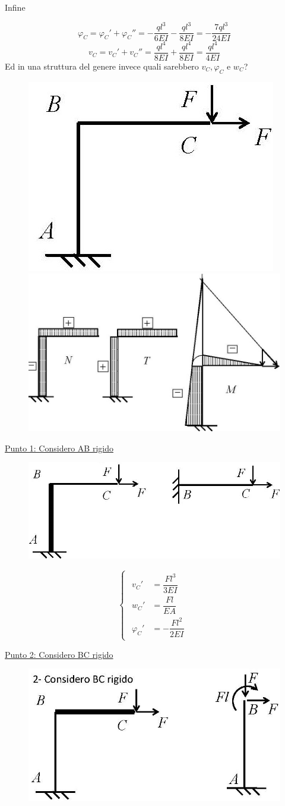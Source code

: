 \documentclass{article}
\begin{document}
\begin{adjustwidth}{2in}{}
		Infine 
		
		\[ \varphi_C = \varphi_C' + \varphi_C'' = -\dfrac{ql^3}{6EI} - \dfrac{ql^3}{8EI} = -\dfrac{7ql^3}{24EI}  \]
		\[ v_C = v_C' + v_C'' = \dfrac{ql^4}{8EI} + \dfrac{ql^4}{8EI} = \dfrac{ql^4}{4EI} \]
\newpage		
		Ed in una struttura del genere invece quali sarebbero $v_C, \varphi_C$ e $w_C$? 
		
\begin{figure}[H]
	\centering
	\includegraphics[width=0.3\linewidth]{"immagini/1.PARTE8_Pagina_22 (2)"}
	\includegraphics[width=0.3\linewidth]{"immagini/1.PARTE8_Pagina_22 (3)"}
\end{figure}

		\underline{Punto 1: Considero AB rigido}
		
\begin{figure}[H]
	\centering
	\includegraphics[width=0.3\linewidth]{"immagini/1.PARTE8_Pagina_22"}
\end{figure}

		\[
		\begin{cases}
			\begin{aligned}
				v_C'& = \dfrac{Fl^3}{3EI} \\
				w_C'& = \dfrac{Fl}{EA} \\
				\varphi_C'& = -\dfrac{Fl^2}{2EI}
			\end{aligned}
		\end{cases}
		\]
		
		\underline{Punto 2: Considero BC rigido}
		
\begin{figure}[H]
	\centering
	\includegraphics[width=0.3\linewidth]{"immagini/1.PARTE8_Pagina_23"}
\end{figure}


\end{adjustwidth}
\end{document}
